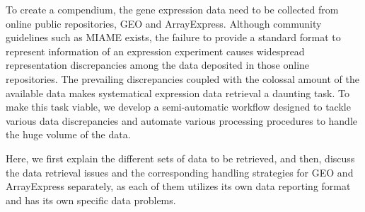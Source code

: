 To create a compendium, the gene expression data need to be collected from
online public repositories, GEO and ArrayExpress.
%
Although community guidelines such as MIAME \cite{Brazma2001} exists, the
failure to provide a standard format to represent information of an expression
experiment causes widespread representation discrepancies among the data
deposited in those online repositories.
%
The prevailing discrepancies coupled with the colossal amount of the available
data makes systematical expression data retrieval a daunting task.
%
To make this task viable, we develop a semi-automatic workflow designed to
tackle various data discrepancies and automate various processing procedures
to handle the huge volume of the data.


Here, we first explain the different sets of data to be retrieved, and
then, discuss the data retrieval issues and the corresponding handling
strategies for GEO and ArrayExpress separately, as each of them
utilizes its own data reporting format and has its own specific data
problems.



%

